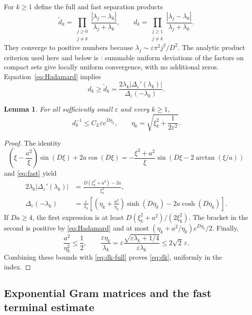 \documentclass[11pt]{article}
\numberwithin{equation}{section}
\newtheorem{lemma}[theorem]{Lemma}
\newcommand{\eps}{\varepsilon}
\begin{document}
For $k\ge1$ define the full and fast separation products
\[
 \widetilde d_k=\prod_{\substack{j\ge0\\j\ne k}}
       \frac{|\lambda_j-\lambda_k|}{\lambda_j+\lambda_k},
 \qquad
 d_k=\prod_{\substack{j\ge1\\j\ne k}}
       \frac{|\lambda_j-\lambda_k|}{\lambda_j+\lambda_k}.
\]
They converge to positive numbers because
$\lambda_j\sim\eps\pi^2j^2/D^2$.
The analytic product criterion used here and below is
\cite[Section 1.10(ix)]{DLMF}: summable uniform deviations of the
factors on compact sets give locally uniform convergence, with no
additional zeros.
Equation~\eqref{eq:Hadamard} implies
\begin{equation}\label{eq:dk-full}
 d_k\ge\widetilde d_k
     =\frac{2\lambda_k|\Delta_\eps'(\lambda_k)|}
                         {\Delta_\eps(-\lambda_k)}.
\end{equation}

\begin{lemma}\label{lem:dk}
For all sufficiently small $\eps$ and every $k\ge1$,
\begin{equation}\label{eq:dk}
 d_k^{-1}\le C_L\eps e^{D\eta_k},\qquad
 \eta_k=\sqrt{\xi_k^2+\frac1{2\eps^2}}.
\end{equation}
\end{lemma}
\begin{proof}
The identity
\[
 \left(\xi-\frac{a^2}{\xi}\right)\sin(D\xi)+2a\cos(D\xi)
 =-\frac{\xi^2+a^2}{\xi}
                 \sin(D\xi-2\arctan(\xi/a))
\]
and \eqref{eq:fast} yield
\begin{align}
 2\lambda_k|\Delta_\eps'(\lambda_k)|
  &=\frac{D(\xi_k^2+a^2)-2a}{\xi_k^2},
       \label{eq:Delta-derivative}\\
 \Delta_\eps(-\lambda_k)
  &=\frac\eps{\lambda_k}
    \left[\left(\eta_k+\frac{a^2}{\eta_k}\right)\sinh(D\eta_k)
                         -2a\cosh(D\eta_k)\right].
       \label{eq:Delta-negative}
\end{align}
If $Da\ge4$, the first expression is at least
$D(\xi_k^2+a^2)/(2\xi_k^2)$.
The bracket in the second is positive by \eqref{eq:Hadamard}
and at most $(\eta_k+a^2/\eta_k)e^{D\eta_k}/2$.
Finally,
\[
 \frac{a^2}{\eta_k^2}\le\frac12,\qquad
 \frac{\eps\eta_k}{\lambda_k}
   =\eps\frac{\sqrt{\eps\lambda_k+1/4}}{\eps\lambda_k}
   \le2\sqrt2\,\eps.
\]
Combining these bounds with \eqref{eq:dk-full} proves \eqref{eq:dk},
uniformly in the index.
\end{proof}

\subsection{Exponential Gram matrices and the fast terminal estimate}
\end{document}
